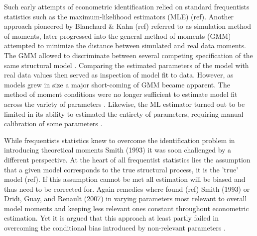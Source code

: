 \documentclass[12pt,a4paper,english]{article} %
\begin{document}
	Such early attempts of econometric identification relied on standard frequentists statistics such as the maximum-likelihood estimators (MLE) (ref). Another approach pioneered by Blanchard \& Kahn (ref) referred to as simulation method of moments, later progressed into the general method of moments (GMM) attempted to minimize the distance between simulated and real data moments. The GMM allowed to discriminate between several competing specification of the same structural model \cite{christiano_current_1992}. Comparing the estimated parameters of the model with real data values then served as inspection of model fit to data. However, as models grew in size a major short-coming of GMM became apparent. The method of moment conditions were no longer sufficient to estimate model fit across the variety of parameters \cite{guerron-quintana_bayesian_2013}. Likewise, the ML estimator turned out to be limited in its ability to estimated the entirety of parameters, requiring manual calibration of some parameters \cite{guerron-quintana_bayesian_2013}.
	
	While frequentists statistics knew to overcome the identification problem in introducing theoretical moments Smith (1993) it was soon challenged by a different perspective. At the heart of all frequentist statistics lies the assumption that a given model corresponds to the true structural process, it is the 'true' model (ref). If this assumption cannot be met all estimation will be biased and thus need to be corrected for. Again remedies where found (ref) Smith (1993) or Dridi, Guay, and Renault (2007) in varying parameters most relevant to overall model moments and keeping less relevant ones constant throughout econometric estimation. Yet it is argued that this approach at least partly failed in overcoming the conditional bias introduced by non-relevant parameters \cite{guerron-quintana_bayesian_2013}.
	
\end{document}
